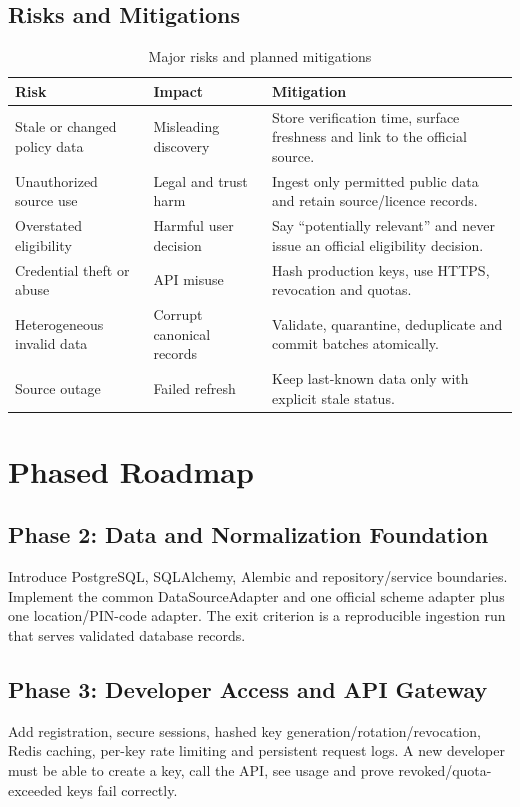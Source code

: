 \documentclass{tietreport}
\begin{document}
\section{Risks and Mitigations}
\begin{table}[H]
\centering
\begin{tabularx}{\textwidth}{@{}p{4cm}XX@{}}
\toprule
\textbf{Risk} & \textbf{Impact} & \textbf{Mitigation} \\
\midrule
Stale or changed policy data & Misleading discovery & Store verification time, surface freshness
and link to the official source. \\
Unauthorized source use & Legal and trust harm & Ingest only permitted public data
and retain source/licence records. \\
Overstated eligibility & Harmful user decision & Say ``potentially relevant'' and never issue an
official eligibility decision. \\
Credential theft or abuse & API misuse & Hash production keys, use HTTPS, revocation and quotas. \\
Heterogeneous invalid data & Corrupt canonical records & Validate, quarantine, deduplicate and commit
batches atomically. \\
Source outage & Failed refresh & Keep last-known data only with explicit stale status. \\
\bottomrule
\end{tabularx}
\caption{Major risks and planned mitigations}
\label{tab:risks}
\end{table}

\chapter{Phased Roadmap}

\section{Phase 2: Data and Normalization Foundation}
Introduce PostgreSQL, SQLAlchemy, Alembic and repository/service boundaries. Implement the
common DataSourceAdapter and one official scheme adapter plus one location/PIN-code adapter.
The exit criterion is a reproducible ingestion run that serves validated database records.

\section{Phase 3: Developer Access and API Gateway}
Add registration, secure sessions, hashed key generation/rotation/revocation, Redis caching,
per-key rate limiting and persistent request logs. A new developer must be able to create a key,
call the API, see usage and prove revoked/quota-exceeded keys fail correctly.
\end{document}
